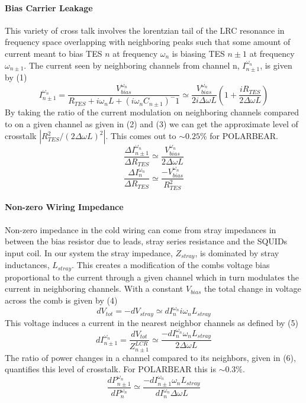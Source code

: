 \paragraph{Bias Carrier Leakage}
This variety of cross talk involves the lorentzian tail of the LRC resonance in frequency space overlapping with neighboring peaks such that some amount of current meant to bias TES $n$ at frequency $\omega_n$ is biasing TES $n\pm1$ at frequency $\omega_{n\pm1}$. The current seen by neighboring channels from channel n, $I^{\omega_n}_{n\pm1}$, is given by (1)
\begin{equation}
I^{\omega_n}_{n\pm1} = \frac{V^{\omega_n}_{bias}}{R_{TES}+i\omega_nL+(i\omega_nC_{n\pm1})^-1} \simeq \frac{V^{\omega_n}_{bias}}{2i\Delta\omega L}\left(1+\frac{iR_{TES}}{2\Delta\omega L}\right)
\end{equation}
By taking the ratio of the current modulation on neighboring channels compared to on a given channel as given in (2) and (3) we can get  the approximate level of crosstalk $|R^2_{TES}/(2\Delta \omega L)^2|$. This comes out to $\sim0.25\%$ for POLARBEAR.
\begin{equation}
\frac{\Delta I^{\omega_n}_{n\pm1}}{\Delta R_{TES}} \simeq \frac{V^{\omega_n}_{bias}}{2\Delta\omega L}
\end{equation}
\begin{equation}
\frac{\Delta I^{\omega_n}_{n}}{\Delta R_{TES}} \simeq \frac{-V^{\omega_n}_{bias}}{R^2_{TES}}
\end{equation}

\paragraph{Non-zero Wiring Impedance}
Non-zero impedance in the cold wiring can come from stray impedances in between the bias resistor due to leads, stray series resistance and the SQUIDs input coil. In our system the stray impedance, $Z_{stray}$, is dominated by stray inductances, $L_{stray}$. This creates a modification of the combs voltage bias proportional to the current through a given channel which in turn modulates the current in neighboring channels. With a constant $V_{bias}$ the total change in voltage across the comb is given by (4)
\begin{equation}
dV_{tot}=-dV_{stray}\simeq dI^{\omega_n}_{n}i\omega_nL_{stray}
\end{equation}
This voltage induces a current in the nearest neighbor channels as defined by (5)
\begin{equation}
dI^{\omega_n}_{n\pm1}=\frac{dV_{tot}}{Z^{LCR}_{n\pm1}}\simeq \frac{-dI^{\omega_n}_{n}\omega_nL_{stray}}{2\Delta \omega L}
\end{equation}
The ratio of power changes in a channel compared to its neighbors, given in (6), quantifies this level of crosstalk. For POLARBEAR this is $\sim0.3\%$.
\begin{equation}
\frac{dP^{\omega_n}_{n\pm1}}{dP^{\omega_n}_{n}}\simeq \frac{-dI^{\omega_n}_{n\pm1}\omega_nL_{stray}}{dI^{\omega_n}_{n}\Delta\omega L}
\end{equation}
